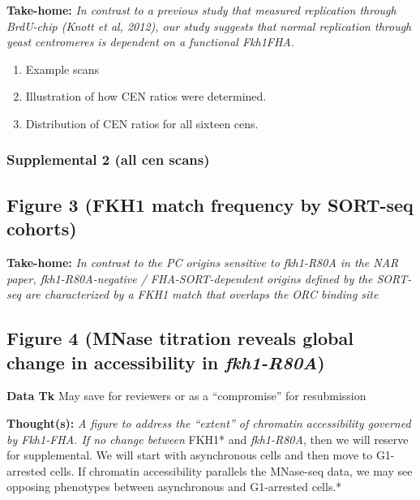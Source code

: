 \documentclass[
]{article}
\providecommand{\tightlist}{%
  \setlength{\itemsep}{0pt}\setlength{\parskip}{0pt}}
\begin{document}
\textbf{Take-home:} \emph{In contrast to a previous study that measured replication through BrdU-chip (Knott et al, 2012), our study suggests that normal replication through yeast centromeres is dependent on a functional Fkh1FHA.}

\begin{enumerate}
\def\labelenumi{\alph{enumi})}
\tightlist
\item
  Example scans~\\
\item
  Illustration of how CEN ratios were determined.~\\
\item
  Distribution of CEN ratios for all sixteen cens.~
\end{enumerate}

\hypertarget{supplemental-2-all-cen-scans}{%
\subsubsection{Supplemental 2 (all cen scans)}\label{supplemental-2-all-cen-scans}}

\hypertarget{figure-3-fkh1-match-frequency-by-sort-seq-cohorts}{%
\subsection{Figure 3 (FKH1 match frequency by SORT-seq cohorts)}\label{figure-3-fkh1-match-frequency-by-sort-seq-cohorts}}

\textbf{Take-home:} \emph{In contrast to the PC origins sensitive to fkh1-R80A in the NAR paper, fkh1-R80A-negative / FHA-SORT-dependent origins defined by the SORT-seq are characterized by a FKH1 match that overlaps the ORC binding site}

\hypertarget{figure-4-mnase-titration-reveals-global-change-in-accessibility-in-fkh1-r80a}{%
\subsection{\texorpdfstring{Figure 4 (MNase titration reveals global change in accessibility in \emph{fkh1-R80A})}{Figure 4 (MNase titration reveals global change in accessibility in fkh1-R80A)}}\label{figure-4-mnase-titration-reveals-global-change-in-accessibility-in-fkh1-r80a}}

\textbf{Data Tk} May save for reviewers or as a ``compromise'' for resubmission~

\textbf{Thought(s):} \emph{A figure to address the ``extent'' of chromatin accessibility governed by Fkh1-FHA. If no change between} FKH1* and \emph{fkh1-R80A}, then we will reserve for supplemental. We will start with asynchronous cells and then move to G1-arrested cells. If chromatin accessibility parallels the MNase-seq data, we may see opposing phenotypes between asynchronous and G1-arrested cells.*~
\end{document}
